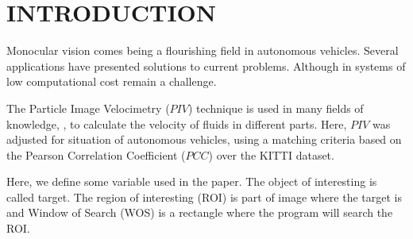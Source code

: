 \section{INTRODUCTION}

Monocular vision comes being a flourishing field in autonomous vehicles. 
Several applications have presented solutions to current problems. 
Although in systems  of low computational cost remain a challenge. 


The Particle Image Velocimetry ($PIV$)\cite{Bastiaans} technique is used in many fields of 
knowledge, \cite{Story, Xu}, to calculate the velocity of fluids in different parts. 
Here, $PIV$ was adjusted for situation of autonomous vehicles, using a matching criteria based on 
the Pearson Correlation Coefficient ($PCC$)\cite{Miranda Neto} over the KITTI dataset\cite{Geiger}.

Here, we define some variable used in the paper. The object of interesting is called target.
The region of interesting (ROI) is part of image where the target is and
Window of Search (WOS) is a rectangle where the program will search the ROI. 

